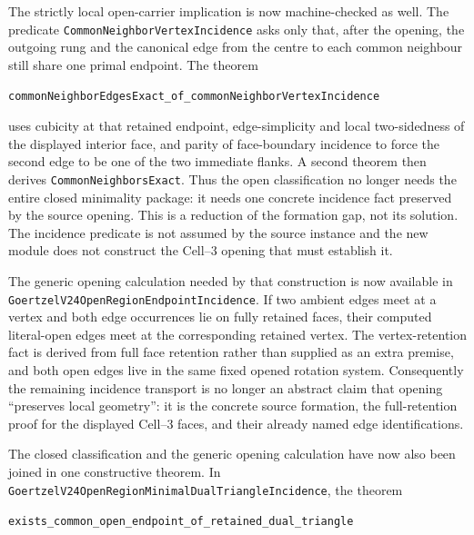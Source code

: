 \documentclass[11pt]{article}
\theoremstyle{definition}
\begin{document}
The strictly local open-carrier implication is now machine-checked as well.
The predicate \texttt{CommonNeighborVertexIncidence} asks only that, after the
opening, the outgoing rung and the canonical edge from the centre to each
common neighbour still share one primal endpoint.  The theorem

\begin{center}
\texttt{commonNeighborEdgesExact\_of\_commonNeighborVertexIncidence}
\end{center}

uses cubicity at that retained endpoint, edge-simplicity and local
two-sidedness of the displayed interior face, and parity of face-boundary
incidence to force the second edge to be one of the two immediate flanks.  A
second theorem then derives \texttt{CommonNeighborsExact}.  Thus the open
classification no longer needs the entire closed minimality package: it needs
one concrete incidence fact preserved by the source opening.  This is a
reduction of the formation gap, not its solution.  The incidence predicate is
not assumed by the source instance and the new module does not construct the
Cell--3 opening that must establish it.

The generic opening calculation needed by that construction is now available
in \texttt{GoertzelV24OpenRegionEndpointIncidence}.  If two ambient edges meet
at a vertex and both edge occurrences lie on fully retained faces, their
computed literal-open edges meet at the corresponding retained vertex.  The
vertex-retention fact is derived from full face retention rather than supplied
as an extra premise, and both open edges live in the same fixed opened rotation
system.  Consequently the remaining incidence transport is no longer an
abstract claim that opening ``preserves local geometry'': it is the concrete
source formation, the full-retention proof for the displayed Cell--3 faces,
and their already named edge identifications.

The closed classification and the generic opening calculation have now also
been joined in one constructive theorem.  In
\texttt{GoertzelV24OpenRegionMinimalDualTriangleIncidence}, the theorem

\begin{center}
\texttt{exists\_common\_open\_endpoint\_of\_retained\_dual\_triangle}
\end{center}
\end{document}
